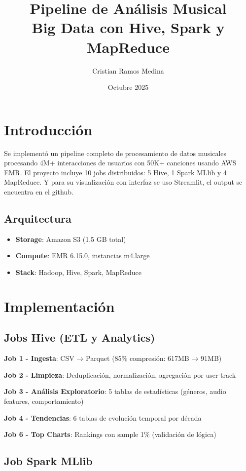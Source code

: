 \documentclass[11pt,a4paper]{article}
\title{\textbf{Pipeline de Análisis Musical} \\ \large{Big Data con Hive, Spark y MapReduce}}
\author{Cristian Ramos Medina}
\date{Octubre 2025}
\begin{document}
\maketitle

\section{Introducción}
Se implementó un pipeline completo de procesamiento de datos musicales procesando 4M+ interacciones de usuarios con 50K+ canciones usando AWS EMR. El proyecto incluye 10 jobs distribuidos: 5 Hive, 1 Spark MLlib y 4 MapReduce. Y para su visualización con interfaz se uso Streamlit, el output se encuentra en el github.

\subsection{Arquitectura}
\begin{itemize}
    \item \textbf{Storage}: Amazon S3 (1.5 GB total)
    \item \textbf{Compute}: EMR 6.15.0, instancias m4.large
    \item \textbf{Stack}: Hadoop, Hive, Spark, MapReduce	
\end{itemize}

\section{Implementación}

\subsection{Jobs Hive (ETL y Analytics)}

\textbf{Job 1 - Ingesta}: CSV → Parquet (85\% compresión: 617MB → 91MB)

\textbf{Job 2 - Limpieza}: Deduplicación, normalización, agregación por user-track

\textbf{Job 3 - Análisis Exploratorio}: 5 tablas de estadísticas (géneros, audio features, comportamiento)

\textbf{Job 4 - Tendencias}: 6 tablas de evolución temporal por década

\textbf{Job 6 - Top Charts}: Rankings con sample 1\% (validación de lógica)

\subsection{Job Spark MLlib}
\end{document}

